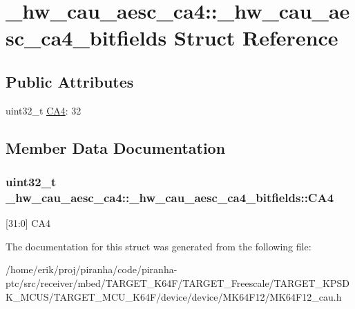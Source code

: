 \hypertarget{struct__hw__cau__aesc__ca4_1_1__hw__cau__aesc__ca4__bitfields}{}\section{\+\_\+hw\+\_\+cau\+\_\+aesc\+\_\+ca4\+:\+:\+\_\+hw\+\_\+cau\+\_\+aesc\+\_\+ca4\+\_\+bitfields Struct Reference}
\label{struct__hw__cau__aesc__ca4_1_1__hw__cau__aesc__ca4__bitfields}
\subsection*{Public Attributes}
\begin{DoxyCompactItemize}
\item 
uint32\+\_\+t \hyperlink{struct__hw__cau__aesc__ca4_1_1__hw__cau__aesc__ca4__bitfields_aaac877b533ca2e8cd6ca78d9c34d472a}{C\+A4}\+: 32
\end{DoxyCompactItemize}


\subsection{Member Data Documentation}
\subsubsection[{\texorpdfstring{C\+A4}{CA4}}]{\setlength{\rightskip}{0pt plus 5cm}uint32\+\_\+t \+\_\+hw\+\_\+cau\+\_\+aesc\+\_\+ca4\+::\+\_\+hw\+\_\+cau\+\_\+aesc\+\_\+ca4\+\_\+bitfields\+::\+C\+A4}\hypertarget{struct__hw__cau__aesc__ca4_1_1__hw__cau__aesc__ca4__bitfields_aaac877b533ca2e8cd6ca78d9c34d472a}{}\label{struct__hw__cau__aesc__ca4_1_1__hw__cau__aesc__ca4__bitfields_aaac877b533ca2e8cd6ca78d9c34d472a}
\mbox{[}31\+:0\mbox{]} C\+A4 

The documentation for this struct was generated from the following file\+:\begin{DoxyCompactItemize}
\item 
/home/erik/proj/piranha/code/piranha-\/ptc/src/receiver/mbed/\+T\+A\+R\+G\+E\+T\+\_\+\+K64\+F/\+T\+A\+R\+G\+E\+T\+\_\+\+Freescale/\+T\+A\+R\+G\+E\+T\+\_\+\+K\+P\+S\+D\+K\+\_\+\+M\+C\+U\+S/\+T\+A\+R\+G\+E\+T\+\_\+\+M\+C\+U\+\_\+\+K64\+F/device/device/\+M\+K64\+F12/M\+K64\+F12\+\_\+cau.\+h\end{DoxyCompactItemize}
